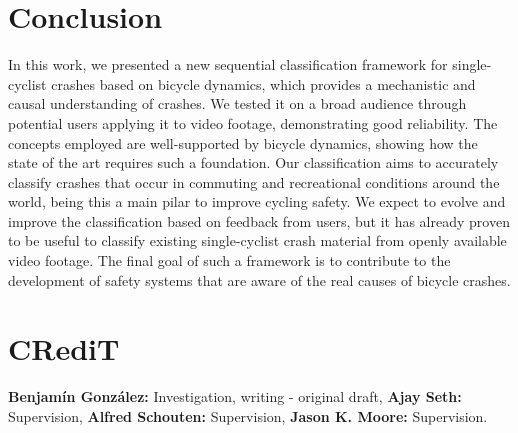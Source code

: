 \documentclass{article}
\begin{document}
\section{Conclusion}
% 
In this work, we presented a new sequential classification framework for single-cyclist crashes based on bicycle dynamics, which provides a mechanistic and causal understanding of crashes. 
%
We tested it on a broad audience through potential users applying it to video footage, demonstrating good reliability.
%
The concepts employed are well-supported by bicycle dynamics, showing how the state of the art requires such a foundation.
%
Our classification aims to accurately classify crashes that occur in commuting and recreational conditions around the world, being this a main pilar to improve cycling safety.
%
We expect to evolve and improve the classification based on feedback from users, but it has already proven to be useful to classify existing single-cyclist crash material from openly available video footage.
%
The final goal of such a framework is to contribute to the development of safety systems that are aware of the real causes of bicycle crashes.


\section*{CRediT}

\textbf{Benjamín González:} Investigation, writing - original draft, 
%
\textbf{Ajay Seth:} Supervision,
%
\textbf{Alfred Schouten:} Supervision,
%
\textbf{Jason K. Moore:} Supervision.



\small


\end{document}

